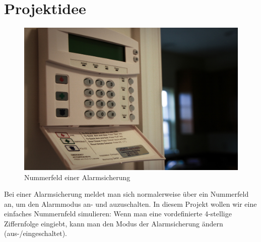 
\chapter{Projektidee}\label{projektidee}

\begin{figure}[htbp]
\centering
\includegraphics{images/keypad.jpg}
\caption[Nummerfeld einer Alarmsicherung]{Nummerfeld einer Alarmsicherung\footnotemark{}}
\end{figure}

Bei einer Alarmsicherung meldet man sich normalerweise über ein Nummerfeld an, um den Alarmmodus an-
und auzuschalten. In diesem Projekt wollen wir eine einfaches Nummernfeld simulieren: Wenn man eine
vordefinierte 4-stellige Ziffernfolge eingiebt, kann man den Modus der Alarmsicherung ändern
(aus-/eingeschaltet).